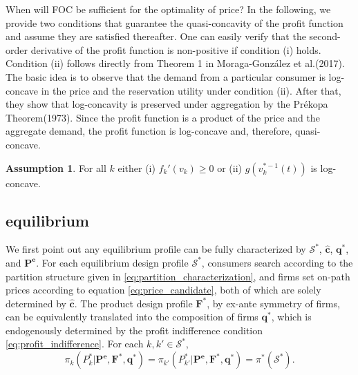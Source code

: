 \documentclass[14pt]{article}
\theoremstyle{plain}
\theoremstyle{definition}
\newtheorem{ass}{Assumption}
\theoremstyle{remark}
\DeclareRobustCommand\1{\futurelet\oneNext\oneCheck}
\renewcommand{\S}{\mathcal{S}}
\begin{document}
When will FOC be sufficient for the optimality of price? In the following, we provide two conditions that guarantee the quasi-concavity of the profit function and assume they are satisfied thereafter. One can easily verify that the second-order derivative of the profit function is non-positive if condition (i) holds. Condition (ii) follows directly from Theorem 1 in Moraga-Gonz{\' a}lez et al.(2017). The basic idea is to observe that the demand from a particular consumer is log-concave in the price and the reservation utility under condition (ii). After that, they show that log-concavity is preserved under aggregation by the Prékopa Theorem(1973). Since the profit function is a product of the price and the aggregate demand, the profit function is log-concave and, therefore, quasi-concave.
\begin{ass}\label{ass:profit_sufficiency}
For all $k$ either (i) $f_k'(v_k)\geq 0$ or (ii) $g(v_k^{*-1}(t))$ is log-concave.
\end{ass}



\subsection{equilibrium}
We first point out any equilibrium profile can be fully characterized by $\S^*$, $\mathbf{\hat{c}}$, $\mathbf{q^*}$, and $\mathbf{P^e}$. For each equilibrium design profile $\S^*$, consumers search according to the partition structure given in \eqref{eq:partition_characterization}, and firms set on-path prices according to equation \eqref{eq:price_candidate}, both of which are solely determined by $\mathbf{\hat{c}}$. The product design profile $\mathbf{F^*}$, by ex-ante symmetry of firms, can be equivalently translated into the composition of firms $\mathbf{q^*}$, which is endogenously determined by the profit indifference condition \eqref{eq:profit_indifference}. For each $k,k'\in \S^*$,
\begin{equation}\label{eq:profit_indifference}
\pi_k(P_k^* |\mathbf{P^e}, \mathbf{F^*}, \mathbf{q^*}) = \pi_{k'}(P_{k'}^*| \mathbf{P^e}, \mathbf{F^*}, \mathbf{q^*})=\pi^*(\S^*).
\end{equation}
\end{document}
